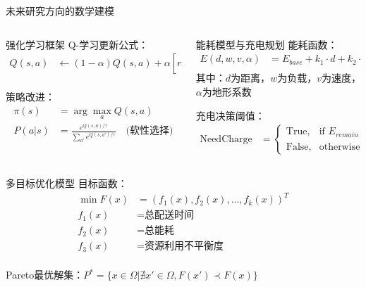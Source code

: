 \documentclass[
10pt,
aspectratio=169,
]{beamer}
\begin{document}
\begin{frame}{未来研究方向的数学建模}
    \begin{columns}
        \begin{column}{0.5\textwidth}
            \begin{exampleblock}{强化学习框架}
                Q-学习更新公式：
                \begin{align}
                Q(s,a) &\leftarrow (1-\alpha)Q(s,a) + \alpha[r + \gamma \max_{a'}Q(s',a')] \\
                \end{align}
                
                策略改进：
                \begin{align}
                \pi(s) &= \arg\max_a Q(s,a) \\
                P(a|s) &= \frac{e^{Q(s,a)/\tau}}{\sum_{a'} e^{Q(s,a')/\tau}} \quad \text{(软性选择)}
                \end{align}
            \end{exampleblock}
        \end{column}
        \begin{column}{0.5\textwidth}
            \begin{alertblock}{能耗模型与充电规划}
                能耗函数：
                \begin{align}
                E(d,w,v,\alpha) &= E_{base} + k_1 \cdot d + k_2 \cdot w + k_3 \cdot v^2 + k_4 \cdot \alpha\\
                \end{align}
                其中：$d$为距离，$w$为负载，$v$为速度，$\alpha$为地形系数
                
                充电决策阈值：
                \begin{align}
                \text{NeedCharge} &= 
                \begin{cases}
                \text{True}, & \text{if } E_{remain} < E_{required} + E_{safety} \\
                \text{False}, & \text{otherwise}
                \end{cases}
                \end{align}
            \end{alertblock}
        \end{column}
    \end{columns}
    
    \begin{block}{多目标优化模型}
        目标函数：
        \begin{align}
        \min F(x) &= (f_1(x), f_2(x), ..., f_k(x))^T \\
        f_1(x) &= \text{总配送时间} \\
        f_2(x) &= \text{总能耗} \\
        f_3(x) &= \text{资源利用不平衡度} \\
        \end{align}
        
        Pareto最优解集：$P^* = \{x \in \Omega | \nexists x' \in \Omega, F(x') \prec F(x) \}$
    \end{block}
\end{frame}
\end{document}
